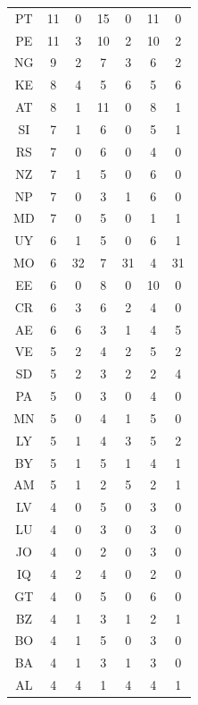 {\begin{table}[ht]
\begin{adjustbox}{width=\textwidth}
\begin{tabular}{c|cc|cc|cc}
                PT & 11 & 0 & 15 & 0 & 11 & 0\\
                PE & 11 & 3 & 10 & 2 & 10 & 2\\
                NG & 9 & 2 & 7 & 3 & 6 & 2\\
                KE & 8 & 4 & 5 & 6 & 5 & 6\\
                AT & 8 & 1 & 11 & 0 & 8 & 1\\
                SI & 7 & 1 & 6 & 0 & 5 & 1\\
                RS & 7 & 0 & 6 & 0 & 4 & 0\\
                NZ & 7 & 1 & 5 & 0 & 6 & 0\\
                NP & 7 & 0 & 3 & 1 & 6 & 0\\
                MD & 7 & 0 & 5 & 0 & 1 & 1\\
                UY & 6 & 1 & 5 & 0 & 6 & 1\\
                MO & 6 & 32 & 7 & 31 & 4 & 31\\
                EE & 6 & 0 & 8 & 0 & 10 & 0\\
                CR & 6 & 3 & 6 & 2 & 4 & 0\\
                AE & 6 & 6 & 3 & 1 & 4 & 5\\
                VE & 5 & 2 & 4 & 2 & 5 & 2\\
                SD & 5 & 2 & 3 & 2 & 2 & 4\\
                PA & 5 & 0 & 3 & 0 & 4 & 0\\
                MN & 5 & 0 & 4 & 1 & 5 & 0\\
                LY & 5 & 1 & 4 & 3 & 5 & 2\\
                BY & 5 & 1 & 5 & 1 & 4 & 1\\
                AM & 5 & 1 & 2 & 5 & 2 & 1\\
                LV & 4 & 0 & 5 & 0 & 3 & 0\\
                LU & 4 & 0 & 3 & 0 & 3 & 0\\
                JO & 4 & 0 & 2 & 0 & 3 & 0\\
                IQ & 4 & 2 & 4 & 0 & 2 & 0\\
                GT & 4 & 0 & 5 & 0 & 6 & 0\\
                BZ & 4 & 1 & 3 & 1 & 2 & 1\\
                BO & 4 & 1 & 5 & 0 & 3 & 0\\
                BA & 4 & 1 & 3 & 1 & 3 & 0\\
                AL & 4 & 4 & 1 & 4 & 4 & 1\\

\end{tabular}
\end{adjustbox}
\end{table}}
